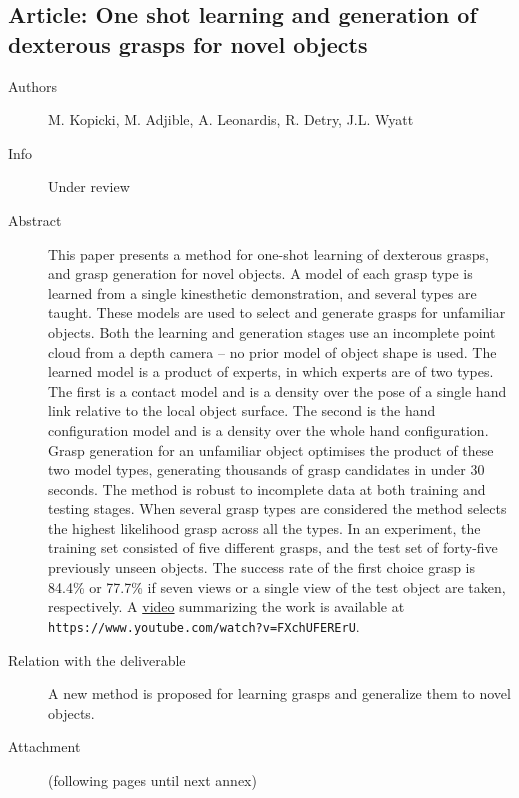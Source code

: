 \documentclass[a4paper,11pt,pdf]{pacmanreport}
\begin{document}
\subsection{Article: One shot learning and generation of dexterous grasps for novel objects} \label{ann:novelObjects}
\begin{description}
    \item[Authors] M. Kopicki, M. Adjible, A. Leonardis, R. Detry, J.L. Wyatt
    \item[Info] Under review
    \item[Abstract] This paper presents a method for one-shot learning of dexterous grasps, and grasp generation for novel objects. A model of each grasp type is learned from a single kinesthetic demonstration, and several types are taught. These models are used to select and generate grasps for unfamiliar objects. Both the learning and generation stages use an incomplete point cloud from a depth camera – no prior model of object shape is used. The learned model is a product of experts, in which experts are of two types. The first is a contact model and is a density over the pose of a single hand link relative to the local object surface. The second is the hand configuration model and is a density over the whole hand configuration. Grasp generation for an unfamiliar object optimises the product of these two model types, generating thousands of grasp candidates in under 30 seconds. The method is robust to incomplete data at both training and testing stages. When several grasp types are considered the method selects the highest likelihood grasp across all the types. In an experiment, the training set consisted  of five different grasps, and the test set of forty-five previously unseen objects. The success rate of the first choice grasp is 84.4\% or 77.7\% if seven views or a single view of the test object are taken, respectively. A \href{https://www.youtube.com/watch?v=FXchUFERErU}{video} summarizing the work is available at {\tt https://www.youtube.com/watch?v=FXchUFERErU}.
    \item[Relation with the deliverable] A new method is proposed for learning grasps and generalize them to novel objects.
    \item[Attachment] (following pages until next annex)
\end{description}


\end{document}
